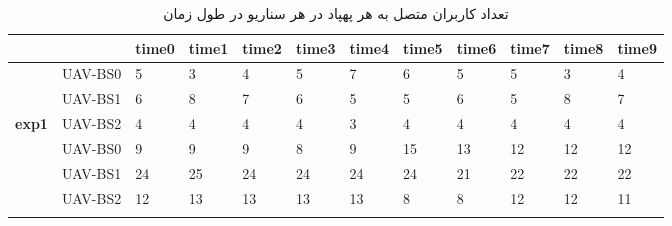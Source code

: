 \begin{table}[]
\centering
\caption{تعداد کاربران متصل به هر پهپاد در هر سناریو در طول زمان}

\begin{tabular}{|ll|l|l|l|l|l|l|l|l|l|l|}
\hline
\multicolumn{2}{|l|}{}                                                                  & \textbf{time0} & \textbf{time1} & \textbf{time2} & \textbf{time3} & \textbf{time4} & \textbf{time5} & \textbf{time6} & \textbf{time7} & \textbf{time8} & \textbf{time9} \\ \hline
\multicolumn{1}{|l|}{}                                                        & UAV-BS0 & 5           & 3           & 4           & 5           & 7           & 6           & 5           & 5           & 3           & 4           \\ \cline{2-12} 
\multicolumn{1}{|l|}{}                                                        & UAV-BS1 & 6           & 8           & 7           & 6           & 5           & 5           & 6           & 5           & 8           & 7           \\ \cline{2-12} 
\multicolumn{1}{|l|}{\multirow{-3}{*}{\textbf{exp1}}}                         & UAV-BS2 & 4           & 4           & 4           & 4           & 3           & 4           & 4           & 4           & 4           & 4           \\ \hline
\rowcolor[HTML]{EFEFEF} 
\multicolumn{1}{|c|}{\cellcolor[HTML]{EFEFEF}}                                & UAV-BS0 & 9          & 9           & 9           & 8           & 9           & 15           & 13          & 12          & 12          & 12          \\ \cline{2-12} 
\rowcolor[HTML]{EFEFEF} 
\multicolumn{1}{|c|}{\cellcolor[HTML]{EFEFEF}}                                & UAV-BS1 & 24          & 25          & 24          & 24          & 24          & 24          & 21          & 22          & 22          & 22            \\ \cline{2-12} 
\rowcolor[HTML]{EFEFEF} 
\multicolumn{1}{|c|}{\cellcolor[HTML]{EFEFEF}}                                & UAV-BS2 & 12          & 13          & 13          & 13          & 13          & 8          & 8          & 12          &  12         & 11            \\ \cline{2-12} 
\rowcolor[HTML]{EFEFEF} 

\end{tabular}
\end{table}
